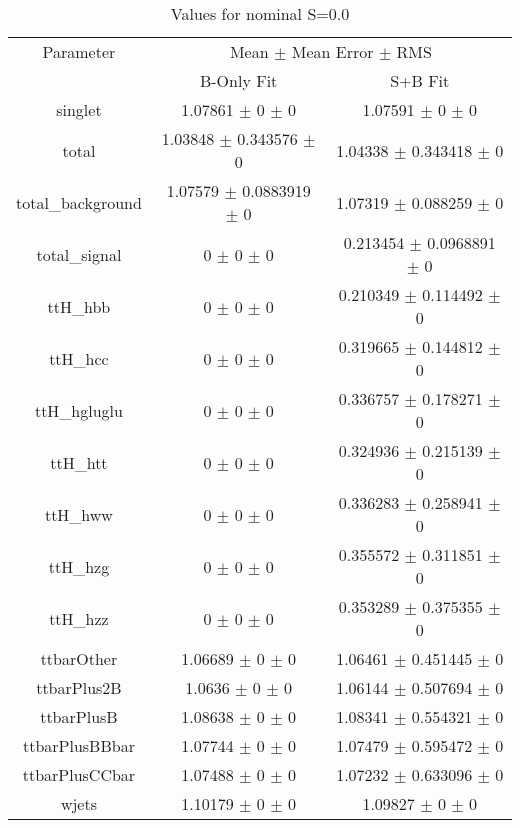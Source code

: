 \begin{table}
\centering
\caption{Values for nominal S=0.0}
\begin{tabular}{ccc}
\toprule
Parameter & \multicolumn{2}{c}{Mean $\pm$ Mean Error $\pm$ RMS}\\
 & B-Only Fit & S+B Fit\\
\midrule
singlet & \num{1.07861} $\pm$ \num{0} $\pm$ \num{0} & \num{1.07591} $\pm$ \num{0} $\pm$ \num{0}\\
total & \num{1.03848} $\pm$ \num{0.343576} $\pm$ \num{0} & \num{1.04338} $\pm$ \num{0.343418} $\pm$ \num{0}\\
total\_background & \num{1.07579} $\pm$ \num{0.0883919} $\pm$ \num{0} & \num{1.07319} $\pm$ \num{0.088259} $\pm$ \num{0}\\
total\_signal & \num{0} $\pm$ \num{0} $\pm$ \num{0} & \num{0.213454} $\pm$ \num{0.0968891} $\pm$ \num{0}\\
ttH\_hbb & \num{0} $\pm$ \num{0} $\pm$ \num{0} & \num{0.210349} $\pm$ \num{0.114492} $\pm$ \num{0}\\
ttH\_hcc & \num{0} $\pm$ \num{0} $\pm$ \num{0} & \num{0.319665} $\pm$ \num{0.144812} $\pm$ \num{0}\\
ttH\_hgluglu & \num{0} $\pm$ \num{0} $\pm$ \num{0} & \num{0.336757} $\pm$ \num{0.178271} $\pm$ \num{0}\\
ttH\_htt & \num{0} $\pm$ \num{0} $\pm$ \num{0} & \num{0.324936} $\pm$ \num{0.215139} $\pm$ \num{0}\\
ttH\_hww & \num{0} $\pm$ \num{0} $\pm$ \num{0} & \num{0.336283} $\pm$ \num{0.258941} $\pm$ \num{0}\\
ttH\_hzg & \num{0} $\pm$ \num{0} $\pm$ \num{0} & \num{0.355572} $\pm$ \num{0.311851} $\pm$ \num{0}\\
ttH\_hzz & \num{0} $\pm$ \num{0} $\pm$ \num{0} & \num{0.353289} $\pm$ \num{0.375355} $\pm$ \num{0}\\
ttbarOther & \num{1.06689} $\pm$ \num{0} $\pm$ \num{0} & \num{1.06461} $\pm$ \num{0.451445} $\pm$ \num{0}\\
ttbarPlus2B & \num{1.0636} $\pm$ \num{0} $\pm$ \num{0} & \num{1.06144} $\pm$ \num{0.507694} $\pm$ \num{0}\\
ttbarPlusB & \num{1.08638} $\pm$ \num{0} $\pm$ \num{0} & \num{1.08341} $\pm$ \num{0.554321} $\pm$ \num{0}\\
ttbarPlusBBbar & \num{1.07744} $\pm$ \num{0} $\pm$ \num{0} & \num{1.07479} $\pm$ \num{0.595472} $\pm$ \num{0}\\
ttbarPlusCCbar & \num{1.07488} $\pm$ \num{0} $\pm$ \num{0} & \num{1.07232} $\pm$ \num{0.633096} $\pm$ \num{0}\\
wjets & \num{1.10179} $\pm$ \num{0} $\pm$ \num{0} & \num{1.09827} $\pm$ \num{0} $\pm$ \num{0}\\
\bottomrule
\end{tabular}
\end{table}